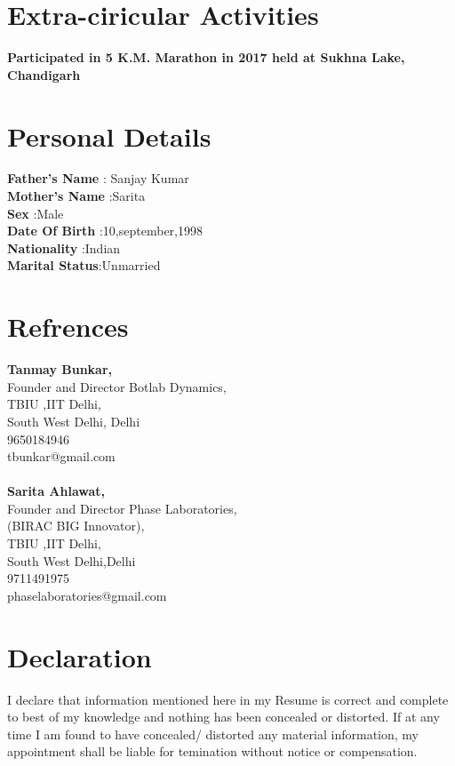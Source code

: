 \documentclass[11pt]{article}
\begin{document}
\section{Extra-ciricular Activities}
\textbf{ Participated in 5 K.M. Marathon in 2017 held at Sukhna Lake, Chandigarh}

\section{Personal Details}
\textbf{Father's Name} : Sanjay Kumar\\
\textbf{Mother's Name} :Sarita \\
\textbf{Sex}           :Male\\
\textbf{Date Of Birth} :10,september,1998\\
\textbf{Nationality}   :Indian\\
\textbf{Marital Status}:Unmarried\\

\section{Refrences}
\textbf{Tanmay Bunkar,}\\
Founder and Director Botlab Dynamics,\\
TBIU ,IIT Delhi,\\
South West Delhi, Delhi\\
9650184946\\
tbunkar@gmail.com\\\\
\textbf{Sarita Ahlawat,}\\
Founder and Director Phase Laboratories,\\
(BIRAC BIG Innovator),\\
TBIU ,IIT Delhi,\\
South West Delhi,Delhi\\
9711491975\\
phaselaboratories@gmail.com\\

\section{Declaration}
{I declare that information mentioned here in my Resume is correct and complete to best of my knowledge and nothing has been concealed or distorted. If at any time I am found to have concealed/ distorted any material information, my appointment shall be liable for temination without notice or compensation.}\\\\
\end{document}
